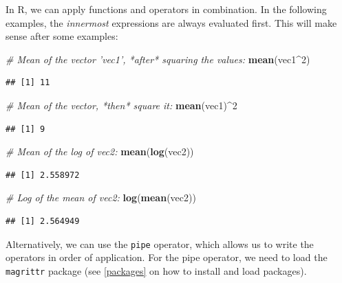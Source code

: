 \documentclass[]{book}
\newenvironment{Shaded}{\begin{snugshade}}{\end{snugshade}}
\newcommand{\CommentTok}[1]{\textcolor[rgb]{0.56,0.35,0.01}{\textit{#1}}}
\newcommand{\DecValTok}[1]{\textcolor[rgb]{0.00,0.00,0.81}{#1}}
\newcommand{\KeywordTok}[1]{\textcolor[rgb]{0.13,0.29,0.53}{\textbf{#1}}}
\newcommand{\NormalTok}[1]{#1}
\newcommand{\OperatorTok}[1]{\textcolor[rgb]{0.81,0.36,0.00}{\textbf{#1}}}
\begin{document}
In R, we can apply functions and operators in combination. In the following examples, the \emph{innermost} expressions are always evaluated first. This will make sense after some examples:

\begin{Shaded}
\begin{Highlighting}[]
\CommentTok{# Mean of the vector 'vec1', *after* squaring the values:}
\KeywordTok{mean}\NormalTok{(vec1}\OperatorTok{^}\DecValTok{2}\NormalTok{)}
\end{Highlighting}
\end{Shaded}

\begin{verbatim}
## [1] 11
\end{verbatim}

\begin{Shaded}
\begin{Highlighting}[]
\CommentTok{# Mean of the vector, *then* square it:}
\KeywordTok{mean}\NormalTok{(vec1)}\OperatorTok{^}\DecValTok{2}
\end{Highlighting}
\end{Shaded}

\begin{verbatim}
## [1] 9
\end{verbatim}

\begin{Shaded}
\begin{Highlighting}[]
\CommentTok{# Mean of the log of vec2:}
\KeywordTok{mean}\NormalTok{(}\KeywordTok{log}\NormalTok{(vec2))}
\end{Highlighting}
\end{Shaded}

\begin{verbatim}
## [1] 2.558972
\end{verbatim}

\begin{Shaded}
\begin{Highlighting}[]
\CommentTok{# Log of the mean of vec2:}
\KeywordTok{log}\NormalTok{(}\KeywordTok{mean}\NormalTok{(vec2))}
\end{Highlighting}
\end{Shaded}

\begin{verbatim}
## [1] 2.564949
\end{verbatim}

Alternatively, we can use the \texttt{pipe} operator, which allows us to write the operators in order of application. For the pipe operator, we need to load the \texttt{magrittr} package (see \ref{packages} on how to install and load packages).
\end{document}
